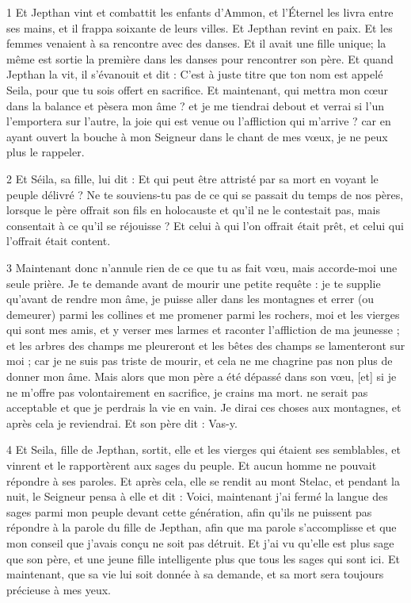 \par 1 Et Jepthan vint et combattit les enfants d'Ammon, et l'Éternel les livra entre ses mains, et il frappa soixante de leurs villes. Et Jepthan revint en paix. Et les femmes venaient à sa rencontre avec des danses. Et il avait une fille unique; la même est sortie la première dans les danses pour rencontrer son père. Et quand Jepthan la vit, il s'évanouit et dit : C'est à juste titre que ton nom est appelé Seila, pour que tu sois offert en sacrifice. Et maintenant, qui mettra mon cœur dans la balance et pèsera mon âme ? et je me tiendrai debout et verrai si l'un l'emportera sur l'autre, la joie qui est venue ou l'affliction qui m'arrive ? car en ayant ouvert la bouche à mon Seigneur dans le chant de mes vœux, je ne peux plus le rappeler.

\par 2 Et Séila, sa fille, lui dit : Et qui peut être attristé par sa mort en voyant le peuple délivré ? Ne te souviens-tu pas de ce qui se passait du temps de nos pères, lorsque le père offrait son fils en holocauste et qu'il ne le contestait pas, mais consentait à ce qu'il se réjouisse ? Et celui à qui l'on offrait était prêt, et celui qui l'offrait était content.

\par 3 Maintenant donc n'annule rien de ce que tu as fait vœu, mais accorde-moi une seule prière. Je te demande avant de mourir une petite requête : je te supplie qu'avant de rendre mon âme, je puisse aller dans les montagnes et errer (ou demeurer) parmi les collines et me promener parmi les rochers, moi et les vierges qui sont mes amis, et y verser mes larmes et raconter l'affliction de ma jeunesse ; et les arbres des champs me pleureront et les bêtes des champs se lamenteront sur moi ; car je ne suis pas triste de mourir, et cela ne me chagrine pas non plus de donner mon âme. Mais alors que mon père a été dépassé dans son vœu, [et] si je ne m'offre pas volontairement en sacrifice, je crains ma mort. ne serait pas acceptable et que je perdrais la vie en vain. Je dirai ces choses aux montagnes, et après cela je reviendrai. Et son père dit : Vas-y.

\par 4 Et Seila, fille de Jepthan, sortit, elle et les vierges qui étaient ses semblables, et vinrent et le rapportèrent aux sages du peuple. Et aucun homme ne pouvait répondre à ses paroles. Et après cela, elle se rendit au mont Stelac, et pendant la nuit, le Seigneur pensa à elle et dit : Voici, maintenant j'ai fermé la langue des sages parmi mon peuple devant cette génération, afin qu'ils ne puissent pas répondre à la parole du fille de Jepthan, afin que ma parole s'accomplisse et que mon conseil que j'avais conçu ne soit pas détruit. Et j'ai vu qu'elle est plus sage que son père, et une jeune fille intelligente plus que tous les sages qui sont ici. Et maintenant, que sa vie lui soit donnée à sa demande, et sa mort sera toujours précieuse à mes yeux.

